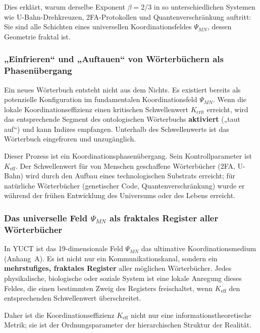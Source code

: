 \documentclass[12pt,a4paper]{article}
\theoremstyle{remark}
\begin{document}
	Dies erklärt, warum derselbe Exponent $\beta=2/3$ in so unterschiedlichen Systemen wie U-Bahn-Drehkreuzen, 2FA-Protokollen und Quantenverschränkung auftritt: Sie sind alle Schichten eines universellen Koordinationsfeldes $\Psi_{MN}$, dessen Geometrie fraktal ist.
	
	\subsubsection{„Einfrieren“ und „Auftauen“ von Wörterbüchern als Phasenübergang}
	
	Ein neues Wörterbuch entsteht nicht aus dem Nichts. Es existiert bereits als potenzielle Konfiguration im fundamentalen Koordinationsfeld $\Psi_{MN}$. Wenn die lokale Koordinationseffizienz einen kritischen Schwellenwert $K_{\mathrm{crit}}$ erreicht, wird das entsprechende Segment des ontologischen Wörterbuchs \textbf{aktiviert} („taut auf“) und kann Indizes empfangen. Unterhalb des Schwellenwerts ist das Wörterbuch eingefroren und unzugänglich.
	
	Dieser Prozess ist ein Koordinationsphasenübergang. Sein Kontrollparameter ist $K_{\mathrm{eff}}$. Der Schwellenwert für von Menschen geschaffene Wörterbücher (2FA, U-Bahn) wird durch den Aufbau eines technologischen Substrats erreicht; für natürliche Wörterbücher (genetischer Code, Quantenverschränkung) wurde er während der frühen Entwicklung des Universums oder des Lebens erreicht.
	
	\subsubsection{Das universelle Feld \(\Psi_{MN}\) als fraktales Register aller Wörterbücher}
	
	In YUCT ist das 19‑dimensionale Feld $\Psi_{MN}$ das ultimative Koordinationsmedium (Anhang~A). Es ist nicht nur ein Kommunikationskanal, sondern ein \textbf{mehrstufiges, fraktales Register} aller möglichen Wörterbücher. Jedes physikalische, biologische oder soziale System ist eine lokale Anregung dieses Feldes, die einen bestimmten Zweig des Registers freischaltet, wenn $K_{\mathrm{eff}}$ den entsprechenden Schwellenwert überschreitet.
	
	Daher ist die Koordinationseffizienz $K_{\mathrm{eff}}$ nicht nur eine informationstheoretische Metrik; sie ist der Ordnungsparameter der hierarchischen Struktur der Realität.
	
\end{document}
